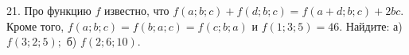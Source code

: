21. Про функцию $f$ известно, что $f(a;b;c)+f(d;b;c)=f(a+d;b;c)+2bc.$ Кроме того, $f(a;b;c)=f(b;a;c)=f(c;b;a)$ и $f(1;3;5)=46.$ Найдите: а) $f(3;2;5);$
б) $f(2;6;10).$\\
